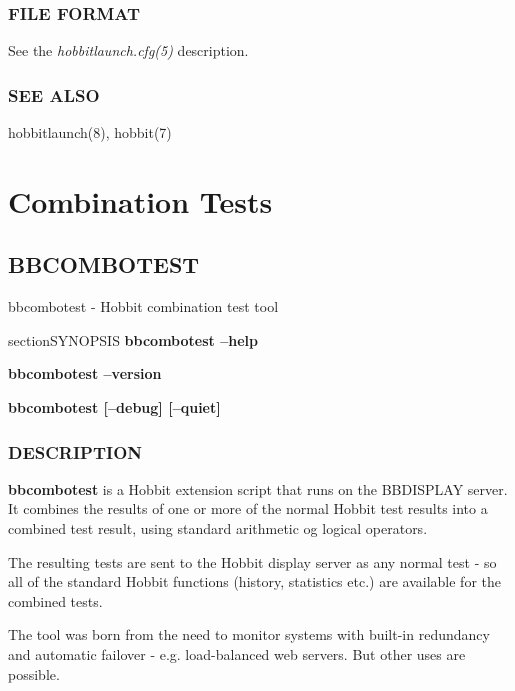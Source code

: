  
\subsection{FILE FORMAT}
 See the \emph{hobbitlaunch.cfg(5)}
 description. 

 
\subsection{SEE ALSO}
hobbitlaunch(8), hobbit(7) 


%
\chapter{Combination Tests}

\newpage
\section{BBCOMBOTEST}
 bbcombotest - Hobbit combination test tool \

section{SYNOPSIS}
\textbf{bbcombotest --help}
 
\textbf{bbcombotest --version}
 
\textbf{bbcombotest [--debug] [--quiet]}


 
\subsection{DESCRIPTION}
\textbf{bbcombotest} is a Hobbit extension script that runs on the
BBDISPLAY server. It combines the results of one or more of the normal
Hobbit test results into a combined test result, using standard
arithmetic og logical operators. 


  The resulting tests are sent to the Hobbit display server as any
  normal test - so all of the standard Hobbit functions (history,
  statistics etc.) are available for the combined tests. 



  The tool was born from the need to monitor systems with built-in
  redundancy and automatic failover - e.g. load-balanced web
  servers. But other uses are possible. 



 
